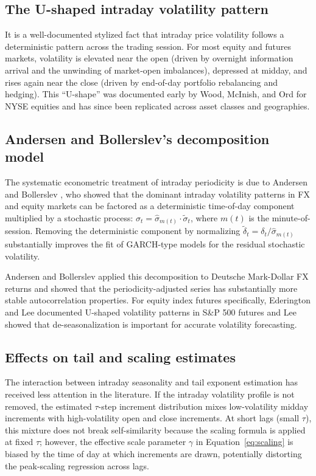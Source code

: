 \documentclass[12pt,a4paper]{article}
\begin{document}
\subsection{The U-shaped intraday volatility pattern}

It is a well-documented stylized fact that intraday price volatility follows a
deterministic pattern across the trading session. For most equity and futures
markets, volatility is elevated near the open (driven by overnight information
arrival and the unwinding of market-open imbalances), depressed at midday, and
rises again near the close (driven by end-of-day portfolio rebalancing and
hedging). This ``U-shape'' was documented early by Wood, McInish, and Ord \cite{WoodMcInishOrd1985}
for NYSE equities and has since been replicated across asset classes and
geographies.

\subsection{Andersen and Bollerslev's decomposition model}

The systematic econometric treatment of intraday periodicity is due to
Andersen and Bollerslev \cite{AndersenBollerslev1997,AndersenBollerslev1998}, who showed that the
dominant intraday volatility patterns in FX and equity markets can be factored
as a deterministic time-of-day component multiplied by a stochastic process:
$\sigma_t = \hat\sigma_{m(t)} \cdot \tilde\sigma_t$, where $m(t)$ is the
minute-of-session. Removing the deterministic component by normalizing
$\tilde\delta_t = \delta_t / \hat\sigma_{m(t)}$ substantially improves the fit
of GARCH-type models for the residual stochastic volatility.

Andersen and Bollerslev \cite{AndersenBollerslev1998} applied this decomposition to Deutsche
Mark-Dollar FX returns and showed that the periodicity-adjusted series has
substantially more stable autocorrelation properties. For equity index futures
specifically, Ederington and Lee \cite{Ederington1993} documented U-shaped volatility patterns
in S\&P 500 futures and Lee \cite{Lee1994} showed that de-seasonalization is
important for accurate volatility forecasting.

\subsection{Effects on tail and scaling estimates}

The interaction between intraday seasonality and tail exponent estimation has
received less attention in the literature. If the intraday volatility profile
is not removed, the estimated $\tau$-step increment distribution mixes
low-volatility midday increments with high-volatility open and close increments.
At short lags (small $\tau$), this mixture does not break self-similarity
because the scaling formula is applied at fixed $\tau$; however, the effective
scale parameter $\gamma$ in Equation~\eqref{eq:scaling} is biased by the time
of day at which increments are drawn, potentially distorting the peak-scaling
regression across lags.
\end{document}
